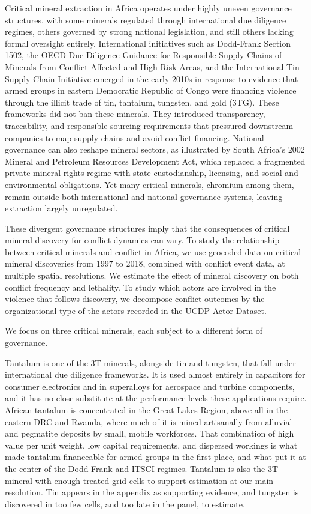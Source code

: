 \documentclass[11pt]{article}
\begin{document}
Critical mineral extraction in Africa operates under highly uneven governance structures, with some minerals regulated through international due diligence regimes, others governed by strong national legislation, and still others lacking formal oversight entirely. International initiatives such as Dodd-Frank Section 1502, the OECD Due Diligence Guidance for Responsible Supply Chains of Minerals from Conflict-Affected and High-Risk Areas, and the International Tin Supply Chain Initiative emerged in the early 2010s in response to evidence that armed groups in eastern Democratic Republic of Congo were financing violence through the illicit trade of tin, tantalum, tungsten, and gold (3TG). These frameworks did not ban these minerals. They introduced transparency, traceability, and responsible-sourcing requirements that pressured downstream companies to map supply chains and avoid conflict financing. National governance can also reshape mineral sectors, as illustrated by South Africa's 2002 Mineral and Petroleum Resources Development Act, which replaced a fragmented private mineral-rights regime with state custodianship, licensing, and social and environmental obligations. Yet many critical minerals, chromium among them, remain outside both international and national governance systems, leaving extraction largely unregulated.

These divergent governance structures imply that the consequences of critical mineral discovery for conflict dynamics can vary. To study the relationship between critical minerals and conflict in Africa, we use geocoded data on critical mineral discoveries from 1997 to 2018, combined with conflict event data, at multiple spatial resolutions. We estimate the effect of mineral discovery on both conflict frequency and lethality. To study which actors are involved in the violence that follows discovery, we decompose conflict outcomes by the organizational type of the actors recorded in the UCDP Actor Dataset.

We focus on three critical minerals, each subject to a different form of governance.

Tantalum is one of the 3T minerals, alongside tin and tungsten, that fall under international due diligence frameworks. It is used almost entirely in capacitors for consumer electronics and in superalloys for aerospace and turbine components, and it has no close substitute at the performance levels these applications require. African tantalum is concentrated in the Great Lakes Region, above all in the eastern DRC and Rwanda, where much of it is mined artisanally from alluvial and pegmatite deposits by small, mobile workforces. That combination of high value per unit weight, low capital requirements, and dispersed workings is what made tantalum financeable for armed groups in the first place, and what put it at the center of the Dodd-Frank and ITSCI regimes. Tantalum is also the 3T mineral with enough treated grid cells to support estimation at our main resolution. Tin appears in the appendix as supporting evidence, and tungsten is discovered in too few cells, and too late in the panel, to estimate.
\end{document}
